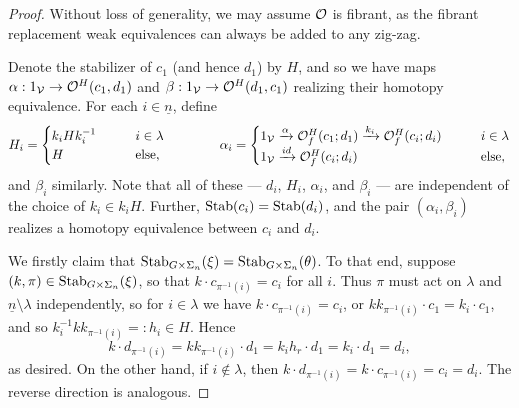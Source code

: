 \documentclass[psamsfonts,oneside,10pt,letterpaper
,draft
]{amsart}%
\renewcommand{\1}{\ensuremath{\mathbb{id}}}
\begin{document}
\begin{proof}
      Without loss of generality, we may assume $\mathcal{O}$ is fibrant,
      as the fibrant replacement weak equivalences can always be added to any zig-zag.

      Denote the stabilizer of $c_1$ (and hence $d_1$) by $H$, and so we have maps
      $\alpha: 1_{\mathcal V} \to \mathcal{O}^H(c_1,d_1)$ and $\beta: 1_{\mathcal V} \to \mathcal{O}^H(d_1,c_1)$
      realizing their homotopy equivalence.
      For each $i \in \underline{n}$, define
      \begin{equation}
            \label{WEAKEQCOLORS_EQ}
            H_i =
            \begin{cases}
                  k_i H k_i^{-1} \qquad & i \in \lambda
                  \\
                  H & \mbox{else,}
            \end{cases}
            \qquad
            \qquad 
            \alpha_i =
            \begin{cases}
                  1_{\mathcal V} \xrightarrow{\alpha} \mathcal{O}^H_f(c_1;d_1) \xrightarrow{k_i} \mathcal{O}^H_f(c_i;d_i) \qquad & i \in \lambda
                  \\
                  1_{\mathcal V} \xrightarrow{id} \mathcal{O}^H_f(c_i;d_i) & \mbox{else},
            \end{cases}
      \end{equation}
      and $\beta_i$ similarly.
      Note that all of these --- $d_i$, $H_i$, $\alpha_i$, and $\beta_i$ --- are independent of the choice of $k_i\in k_i H$.
      Further, $\mathrm{Stab}(c_i) = \mathrm{Stab}(d_i)$, and
      the pair $(\alpha_i,\beta_i)$ realizes a homotopy equivalence between $c_i$ and $d_i$.

      We firstly claim that $\mathrm{Stab}_{G \times \Sigma_n}(\xi) = \mathrm{Stab}_{G \times \Sigma_n}(\theta)$.
      To that end, suppose $(k,\pi)\in \mathrm{Stab}_{G\times \Sigma_n}(\xi)$, so that $k \cdot c_{\pi^{-1}(i)} = c_i$ for all $i$.
      Thus $\pi$ must act on $\lambda$ and $\underline{n} \setminus \lambda$ independently,
      so for $i \in \lambda$ we have $k \cdot c_{\pi^{-1}(i)} = c_i$, or
      $k k_{\pi^{-1}(i)} \cdot c_1 = k_i \cdot c_1$, and so
      $k_i^{-1} k k_{\pi^{-1}(i)} =:h_i \in H$. Hence 
      \begin{equation}
            k \cdot d_{\pi^{-1}(i)} = k k_{\pi^{-1}(i)} \cdot d_1 = k_i h_r \cdot d_1 = k_i \cdot d_1 = d_i,
      \end{equation}
      as desired.
      On the other hand, if $i \not \in \lambda$, then
      $k \cdot d_{\pi^{-1}(i)} = k \cdot c_{\pi^{-1}(i)} = c_i = d_i$.
      The reverse direction is analogous.
      

\end{proof}
\end{document}
